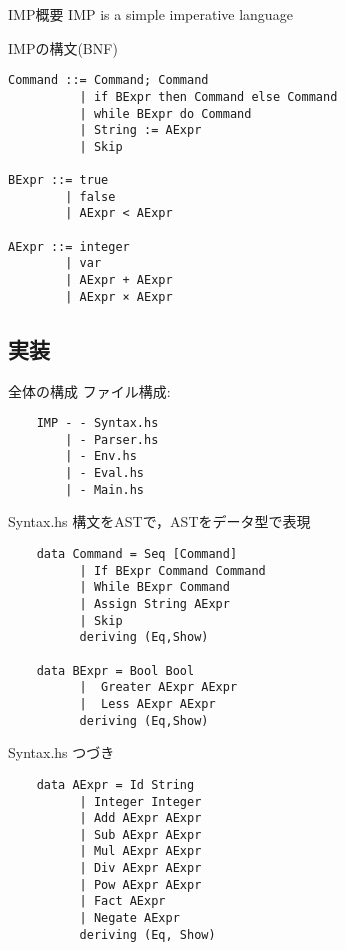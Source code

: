 \documentclass[uplatex,dvipdfmx,ja=standard]{beamer}
\begin{document}
\begin{frame}{IMP概要}
    \Large IMP is a simple imperative language 
\end{frame}

\begin{frame}[fragile]{IMPの構文(BNF)}
    \begin{verbatim}
Command ::= Command; Command 
          | if BExpr then Command else Command
          | while BExpr do Command
          | String := AExpr
          | Skip

BExpr ::= true
        | false
        | AExpr < AExpr

AExpr ::= integer 
        | var
        | AExpr + AExpr
        | AExpr × AExpr
    \end{verbatim}
\end{frame}

\subsection{実装}

\begin{frame}[fragile]{全体の構成}
    ファイル構成:
    \begin{verbatim}
    IMP - - Syntax.hs
        | - Parser.hs 
        | - Env.hs
        | - Eval.hs
        | - Main.hs
    \end{verbatim}
\end{frame}

\begin{frame}[fragile]{Syntax.hs}
    構文をASTで，ASTをデータ型で表現
    \begin{verbatim}
    data Command = Seq [Command]
          | If BExpr Command Command
          | While BExpr Command 
          | Assign String AExpr
          | Skip
          deriving (Eq,Show)

    data BExpr = Bool Bool
          |  Greater AExpr AExpr
          |  Less AExpr AExpr
          deriving (Eq,Show)
    \end{verbatim}
\end{frame}

\begin{frame}[fragile]{Syntax.hs}
    つづき
    \begin{verbatim}
    data AExpr = Id String 
          | Integer Integer
          | Add AExpr AExpr
          | Sub AExpr AExpr
          | Mul AExpr AExpr
          | Div AExpr AExpr
          | Pow AExpr AExpr
          | Fact AExpr
          | Negate AExpr
          deriving (Eq, Show)
    \end{verbatim}
\end{frame}
\end{document}

